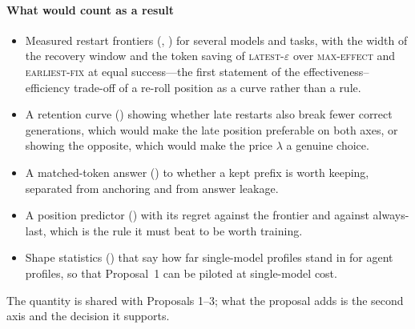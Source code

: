 \documentclass[10pt,a4paper]{article}
\begin{document}
\paragraph{What would count as a result}
\begin{itemize}[leftmargin=1.1em]
\item Measured restart frontiers (, ) for several models and tasks, with the width of the recovery window and the token saving of \textsc{latest-}$\varepsilon$ over \textsc{max-effect} and \textsc{earliest-fix} at equal success---the first statement of the effectiveness--efficiency trade-off of a re-roll position as a curve rather than a rule.
\item A retention curve () showing whether late restarts also break fewer correct generations, which would make the late position preferable on both axes, or showing the opposite, which would make the price $\lambda$ a genuine choice.
\item A matched-token answer () to whether a kept prefix is worth keeping, separated from anchoring and from answer leakage.
\item A position predictor () with its regret against the frontier and against always-last, which is the rule it must beat to be worth training.
\item Shape statistics () that say how far single-model profiles stand in for agent profiles, so that Proposal~1 can be piloted at single-model cost.
\end{itemize}
The quantity is shared with Proposals 1--3; what the proposal adds is the second axis and the decision it supports.

\clearpage

\end{document}
